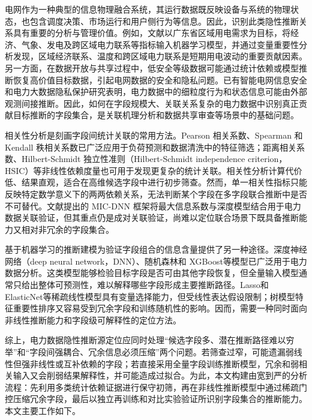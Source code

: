 \documentclass[UTF8,zihao=5,twoside]{ctexart}
\numberwithin{equation}{section}
\begin{document}
电网作为一种典型的信息物理融合系统，其运行数据既反映设备与系统的物理状态，也包含调度决策、市场运行和用户侧行为等信息。因此，识别此类隐性推断关系具有重要的分析与管理价值。例如，文献\cite{ref-chen-demand}以广东省区域用电需求为目标，将经济、气象、发电及跨区域电力联系等指标输入机器学习模型，并通过变量重要性分析发现，区域经济联系、温度和跨区域电力联系是短期用电波动的重要贡献因素。另一方面，在数据开放与共享过程中，低安全等级数据可能通过统计依赖或模型推断恢复高价值目标数据，引起电网数据的安全和隐私问题\cite{ref-liu-data-inference}。已有智能电网信息安全和电力大数据隐私保护研究表明，电力数据中的细粒度行为和状态信息可能由外部观测间接推断\cite{ref-sankar,ref-giaconi,ref-adewole,ref-zhang-sgcc,ref-chen-privacy}。因此，如何在字段规模大、关联关系复杂的电力数据中识别真正贡献目标推断的字段集合，是关联机理分析和数据共享审查等场景中的基础问题。

相关性分析是刻画字段间统计关联的常用方法。Pearson 相关系数、Spearman 和 Kendall 秩相关系数已广泛应用于负荷预测和数据清洗中的特征筛选\cite{ref-lan-load,ref-jiao-pv,ref-deng-load}；距离相关系数\cite{ref-szekely-dcorr}、Hilbert-Schmidt 独立性准则（Hilbert-Schmidt independence criterion，HSIC）等非线性依赖度量也可用于发现更复杂的统计关联。相关性分析计算代价低、结果直观，适合在高维候选字段中进行初步筛查。然而，单一相关性指标只能反映特定数学意义下的两两依赖关系，无法判断某个字段在多字段联合推断中是否不可替代。文献\cite{ref-reshef-mic,ref-xing-micdnn}提出的 MIC-DNN 框架将最大信息系数与深度模型结合用于电力数据关联验证，但其重点仍是成对关联验证，尚难以定位联合场景下既具备推断能力又相对非冗余的字段集合。

基于机器学习的推断建模为验证字段组合的信息含量提供了另一种途径。深度神经网络（deep neural network，DNN）\cite{ref-lecun-deep,ref-goodfellow-deep}、随机森林\cite{ref-breiman-rf}和 XGBoost\cite{ref-chen-xgboost}等模型已广泛用于电力数据分析\cite{ref-wang-meter}。这类模型能够检验目标字段是否可由其他字段恢复，但全量输入模型通常只给出整体可预测性，难以解释哪些字段形成主要推断路径。Lasso\cite{ref-tibshirani-lasso}和 ElasticNet\cite{ref-zou-enet}等稀疏线性模型具有变量选择能力，但受线性表达假设限制；树模型特征重要性排序又容易受到冗余字段和训练随机性的影响。因而，需要一种同时面向非线性推断能力和字段级可解释性的定位方法。

综上，电力数据隐性推断源定位应同时处理“候选字段多、潜在推断路径难以穷举”和“字段间强耦合、冗余信息必须压缩”两个问题。若筛查过窄，可能遗漏弱线性但强非线性或互补依赖的字段；若直接采用全量字段训练推断模型，冗余和弱相关输入又会削弱结果解释性，并可能造成过拟合。为此，本文构建由宽到严的分析流程：先利用多类统计依赖证据进行保守初筛，再在非线性推断模型中通过稀疏门控压缩冗余字段，最后以独立再训练和对比实验验证所识别字段集合的推断能力。本文主要工作如下。
\end{document}
